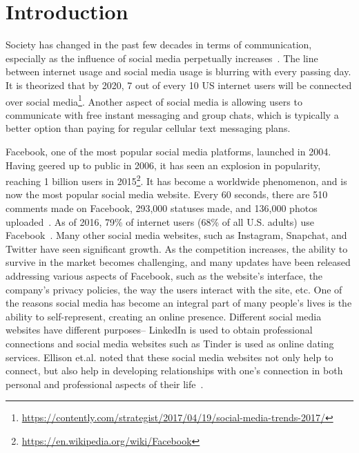 \section{Introduction}
\label{sec:introduction}
Society has changed in the past few decades in terms of communication, especially as the influence of social media perpetually increases~\cite{ellison2007social}. The line between internet usage and social media usage is blurring with every passing day. It is theorized that by 2020, 7 out of every 10 US internet users will be connected over social media\footnote{\label{trends}\url{https://contently.com/strategist/2017/04/19/social-media-trends-2017/}}. Another aspect of social media is allowing users to communicate with free instant messaging and group chats, which is typically a better option than paying for regular cellular text messaging plans.

Facebook, one of the most popular social media platforms, launched in 2004. Having geered up to public in 2006, it has seen an explosion in popularity, reaching 1 billion users in 2015\footnote{\url{https://en.wikipedia.org/wiki/Facebook}}. It has become a worldwide phenomenon, and is now the most popular social media website. Every 60 seconds, there are 510 comments made on Facebook, 293,000 statuses made, and 136,000 photos uploaded~\cite{greenwood2016social}. As of 2016, 79\% of internet users (68\% of all U.S. adults) use Facebook~\cite{greenwood2016social}. Many other social media websites, such as Instagram, Snapchat, and Twitter have seen significant growth. As the competition increases, the ability to survive in the market becomes challenging, and many updates have been released addressing various aspects of Facebook, such as the website's interface, the company's privacy policies, the way the users interact with the site, etc. One of the reasons social media has become an integral part of many people's lives is the ability to self-represent, creating an online presence. Different social media websites have different purposes-- LinkedIn is used to obtain professional connections and social media websites such as Tinder is used as online dating services. Ellison et.al. noted that these social media websites not only help to connect, but also help in developing relationships with one's connection in both personal and professional aspects of their life~\cite{ellison2007benefits}.

